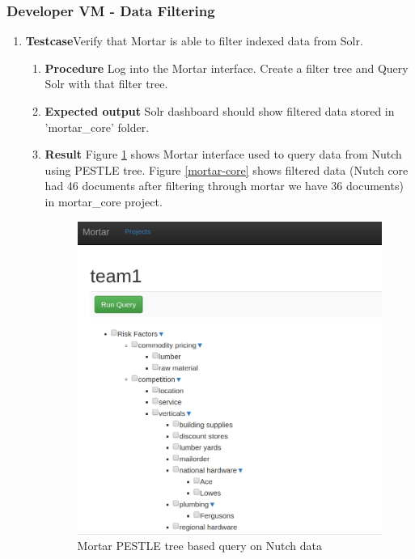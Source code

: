 \subsubsection{Developer VM - Data Filtering}
\begin{enumerate}
\item \textbf{Testcase}\newline Verify that Mortar is able to filter
 indexed data from Solr.
  \begin{enumerate}[label={}]
  \item \textbf{Procedure}\newline
    Log into the Mortar interface. Create a filter tree and Query Solr
    with that filter tree.
  \item \textbf{Expected output}\newline
    Solr dashboard should show filtered data stored in 'mortar\_core' folder.
  \item \textbf{Result}\newline
    Figure \ref{mortar-filter} shows Mortar interface used to query
    data from Nutch using PESTLE tree. Figure \ref{mortar-core} shows
    filtered data (Nutch core had 46 documents after filtering through
    mortar we have 36 documents) in mortar\_core project.
    \begin{figure}
      \centering
      \includegraphics[scale=0.4]{screenshots/mortar-filter.png}
      \caption{Mortar PESTLE tree based query on Nutch data}
      \label{mortar-filter}
    \end{figure}


\end{enumerate}
\end{enumerate}
